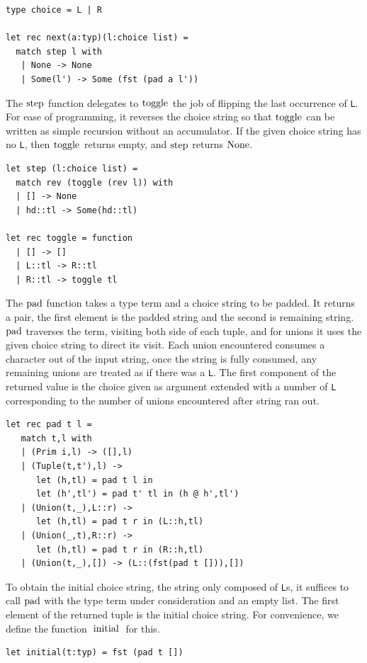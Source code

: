 \documentclass[a4paper,english]{lipics-v2019}
\renewcommand{\L}{{\tt L}\xspace}
\newcommand{\Ls}{{\tt L}s\xspace}
\renewcommand{\c}[1]{\ensuremath{\text{\lstinline{#1}}}\xspace}
\begin{document}
\begin{lstlisting}
type choice = L | R

let rec next(a:typ)(l:choice list) = 
  match step l with
   | None -> None
   | Some(l') -> Some (fst (pad a l'))
\end{lstlisting}

The \c{step} function delegates to \c{toggle} the job of flipping the last
occurrence of \L. For ease of programming, it reverses the choice string so
that \c{toggle} can be written as simple recursion without an accumulator.
If the given choice string has no \L, then \c{toggle} returns empty, and
\c{step} returns \c{None}.

\begin{lstlisting}
let step (l:choice list) =
  match rev (toggle (rev l)) with
  | [] -> None
  | hd::tl -> Some(hd::tl)

let rec toggle = function
  | [] -> []    
  | L::tl -> R::tl
  | R::tl -> toggle tl
\end{lstlisting}

The \c{pad} function takes a type term and a choice string to be padded. It
returns a pair, the first element is the padded string and the second is
remaining string. \c{pad} traverses the term, visiting both side of each
tuple, and for unions it uses the given choice string to direct its visit.
Each union encountered consumes a character out of the input string, once
the string is fully consumed, any remaining unions are treated as if there
was a \L. The first component of the returned value is the choice given as
argument extended with a number of \L corresponding to the number of unions
encountered after string ran out.

\begin{lstlisting}
let rec pad t l =
   match t,l with
   | (Prim i,l) -> ([],l)
   | (Tuple(t,t'),l) -> 
      let (h,tl) = pad t l in
      let (h',tl') = pad t' tl in (h @ h',tl')
   | (Union(t,_),L::r) -> 
      let (h,tl) = pad t r in (L::h,tl)
   | (Union(_,t),R::r) -> 
      let (h,tl) = pad t r in (R::h,tl)
   | (Union(t,_),[]) -> (L::(fst(pad t [])),[])
\end{lstlisting}

To obtain the initial choice string, the string only composed of \Ls, it
suffices to call \c{pad} with the type term under consideration and an empty
list. The first element of the returned tuple is the initial choice
string. For convenience, we define the function \c{initial} for this.

\begin{lstlisting}
let initial(t:typ) = fst (pad t [])
\end{lstlisting}
\end{document}
